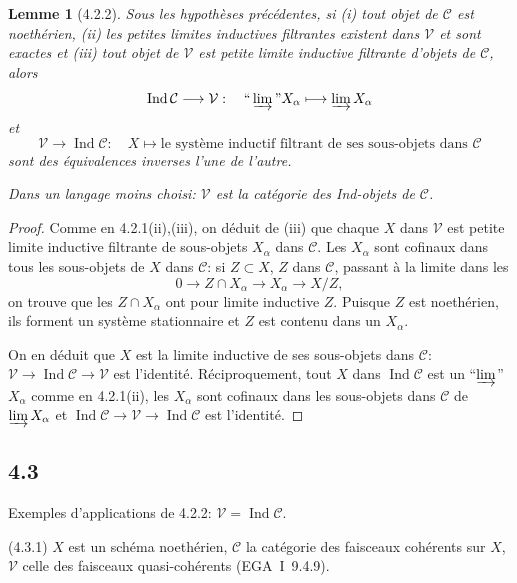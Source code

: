 \documentclass[12pt,a4paper]{article}
\theoremstyle{plain}
\newtheorem{lemma}[theorem]{Lemme}
\theoremstyle{definition}
\theoremstyle{remark}
\DeclareMathOperator{\Ind}{Ind}
\begin{document}
\begin{lemma}[4.2.2]\label{lem:4.2.2}
Sous les hypothèses précédentes, si (i) tout objet de $\mathcal{C}$ est noethérien, (ii) les petites limites inductives filtrantes existent dans $\mathcal{V}$ et sont exactes et (iii) tout objet de $\mathcal{V}$ est petite limite inductive filtrante d'objets de $\mathcal{C}$, alors
\[
\Ind\mathcal{C} 
\longrightarrow 
\mathcal{V}: 
\quad 
\text{``}
\varinjlim
\text{''} X_\alpha 
\longmapsto 
\varinjlim X_\alpha
\]
et
\[
\mathcal{V} 
\longrightarrow 
\Ind\mathcal{C}: 
\quad X 
\longmapsto 
\text{le système inductif filtrant de ses sous-objets dans } 
\mathcal{C}
\]
sont des équivalences inverses l'une de l'autre.

Dans un langage moins choisi: $\mathcal{V}$ est la catégorie des Ind-objets de $\mathcal{C}$.
\end{lemma}

\begin{proof}
Comme en 4.2.1(ii),(iii), on déduit de (iii) que chaque $X$ dans $\mathcal{V}$ est petite limite inductive filtrante de sous-objets $X_\alpha$ dans $\mathcal{C}$. Les $X_\alpha$ sont cofinaux dans tous les sous-objets de $X$ dans $\mathcal{C}$: si $Z 
\subset X$, $Z$ dans $\mathcal{C}$, passant à la limite dans les
\[
0 
\longrightarrow Z 
\cap X_\alpha 
\longrightarrow X_\alpha 
\longrightarrow X/Z,
\]
on trouve que les $Z 
\cap X_\alpha$ ont pour limite inductive $Z$. Puisque $Z$ est noethérien, ils forment un système stationnaire et $Z$ est contenu dans un $X_\alpha$.

On en déduit que $X$ est la limite inductive de ses sous-objets dans $\mathcal{C}$: $\mathcal{V} 
\to 
\Ind\mathcal{C} 
\to 
\mathcal{V}$ est l'identité. Réciproquement, tout $X$ dans $\Ind\mathcal{C}$ est un ``$\varinjlim$'' $X_\alpha$ comme en 4.2.1(ii), les $X_\alpha$ sont cofinaux dans les sous-objets dans $\mathcal{C}$ de $\varinjlim X_\alpha$ et $\Ind\mathcal{C} 
\to 
\mathcal{V} 
\to 
\Ind\mathcal{C}$ est l'identité.
\end{proof}

\subsection*{4.3}

Exemples d'applications de 4.2.2: $\mathcal{V} = 
\Ind\mathcal{C}$.

(4.3.1) $X$ est un schéma noethérien, $\mathcal{C}$ la catégorie des faisceaux cohérents sur $X$, $\mathcal{V}$ celle des faisceaux quasi-cohérents (EGA~I~9.4.9).
\end{document}
